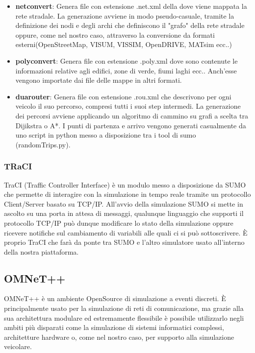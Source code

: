 \begin{itemize}
 	\item \textbf{netconvert}: Genera file con estensione .net.xml della dove viene mappata la rete stradale. La generazione avviene in modo pseudo-casuale, tramite la definizione dei nodi e degli archi che definiscono il "grafo" della rete stradale oppure, come nel nostro caso, attraverso la conversione da formati esterni(OpenStreetMap, VISUM, VISSIM, OpenDRIVE, MATsim ecc..)
 	\item \textbf{polyconvert}: Genera file con estensione .poly.xml dove sono contenute le informazioni relative agli edifici, zone di verde, fiumi laghi ecc.. Anch'esse vengono importate dai file delle mappe in altri formati.
 	 \item \textbf{duarouter}: Genera file con estensione .rou.xml che descrivono per ogni veicolo il suo percorso, compresi tutti i suoi step intermedi. La generazione dei percorsi avviene applicando un algoritmo di cammino su grafi a scelta tra Dijikstra o A*. I punti di partenza e arrivo vengono generati casualmente da uno script in python messo a disposizione tra i tool di sumo (randomTrips.py).
\end{itemize}

\subsubsection{TRaCI}

TraCI (Traffic Controller Interface) è un modulo messo a disposizione da SUMO che permette di interagire con la simulazione in tempo reale tramite un protocollo Client/Server basato su TCP/IP. All'avvio della simulazione SUMO si mette in ascolto su una porta in attesa di messaggi, qualunque linguaggio che supporti il protocollo TCP/IP può dunque modificare lo stato della simulazione oppure ricevere notifiche sul cambiamento di variabili alle quali ci si può sottoscrivere. È proprio TraCI che farà da ponte tra SUMO e l'altro simulatore usato all'interno della nostra piattaforma.

\subsection{OMNeT++}
OMNeT++ è un ambiente OpenSource di simulazione a eventi discreti. È principalmente usato per la simulazione di reti di comunicazione, ma grazie alla sua architettura modulare ed estremamente flessibile è possibile utilizzarlo negli ambiti più disparati come la simulazione di sistemi informatici complessi, architetture hardware o, come nel nostro caso, per supporto alla simulazione veicolare.

